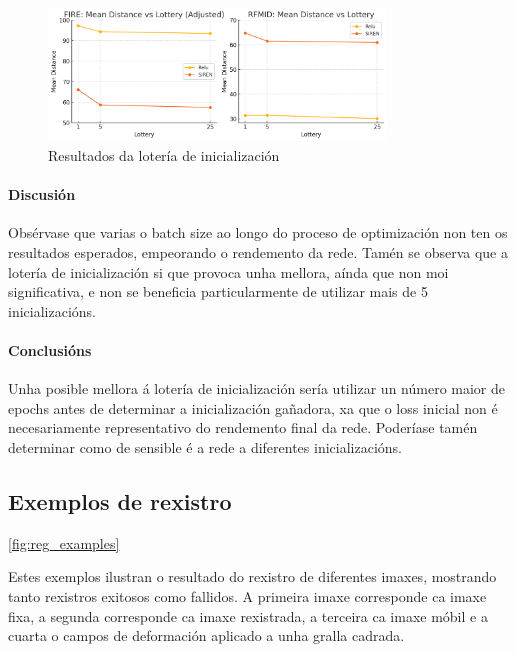 \begin{figure}[ht]
    \centering
    \includegraphics[width=0.8\textwidth]{imaxes/lottery/lotery.png}
    \caption{Resultados da lotería de inicialización}
    \label{fig:lottery}
\end{figure}

\paragraph{Discusión}
\label{par:Discusion-initialization}

Obsérvase que varias o batch size ao longo do proceso de optimización non ten os resultados esperados, empeorando o rendemento da rede.
Tamén se observa que a lotería de inicialización si que provoca unha mellora, aínda que non moi significativa, e non se beneficia particularmente de utilizar mais de 5 inicializacións.

\paragraph{Conclusións}
\label{par:Conclusions-initialization}

Unha posible mellora á lotería de inicialización sería utilizar un número maior de epochs antes de determinar a inicialización gañadora, xa que o loss inicial non é necesariamente representativo do rendemento final da rede.
Poderíase tamén determinar como de sensible é a rede a diferentes inicializacións.

\subsection{Exemplos de rexistro}
\label{subsec:Exemplos de rexistro}

\ref{fig:reg_examples}

Estes exemplos ilustran o resultado do rexistro de diferentes imaxes, mostrando tanto rexistros exitosos como fallidos.
A primeira imaxe corresponde ca imaxe fixa, a segunda corresponde ca imaxe rexistrada, a terceira ca imaxe móbil e a cuarta o campos de deformación aplicado a unha gralla cadrada.

